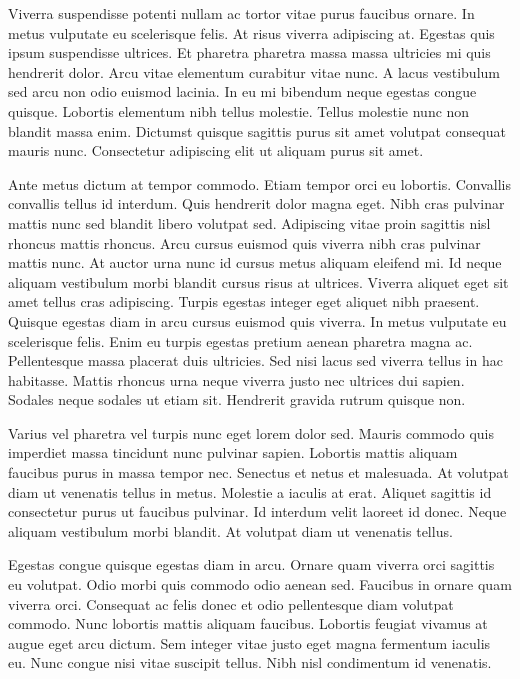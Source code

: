 Viverra suspendisse potenti nullam ac tortor vitae purus faucibus ornare. In metus vulputate eu scelerisque felis. At risus viverra adipiscing at. Egestas quis ipsum suspendisse ultrices. Et pharetra pharetra massa massa ultricies mi quis hendrerit dolor. Arcu vitae elementum curabitur vitae nunc. A lacus vestibulum sed arcu non odio euismod lacinia. In eu mi bibendum neque egestas congue quisque. Lobortis elementum nibh tellus molestie. Tellus molestie nunc non blandit massa enim. Dictumst quisque sagittis purus sit amet volutpat consequat mauris nunc. Consectetur adipiscing elit ut aliquam purus sit amet.

Ante metus dictum at tempor commodo. Etiam tempor orci eu lobortis. Convallis convallis tellus id interdum. Quis hendrerit dolor magna eget. Nibh cras pulvinar mattis nunc sed blandit libero volutpat sed. Adipiscing vitae proin sagittis nisl rhoncus mattis rhoncus. Arcu cursus euismod quis viverra nibh cras pulvinar mattis nunc. At auctor urna nunc id cursus metus aliquam eleifend mi. Id neque aliquam vestibulum morbi blandit cursus risus at ultrices. Viverra aliquet eget sit amet tellus cras adipiscing. Turpis egestas integer eget aliquet nibh praesent. Quisque egestas diam in arcu cursus euismod quis viverra. In metus vulputate eu scelerisque felis. Enim eu turpis egestas pretium aenean pharetra magna ac. Pellentesque massa placerat duis ultricies. Sed nisi lacus sed viverra tellus in hac habitasse. Mattis rhoncus urna neque viverra justo nec ultrices dui sapien. Sodales neque sodales ut etiam sit. Hendrerit gravida rutrum quisque non.

Varius vel pharetra vel turpis nunc eget lorem dolor sed. Mauris commodo quis imperdiet massa tincidunt nunc pulvinar sapien. Lobortis mattis aliquam faucibus purus in massa tempor nec. Senectus et netus et malesuada. At volutpat diam ut venenatis tellus in metus. Molestie a iaculis at erat. Aliquet sagittis id consectetur purus ut faucibus pulvinar. Id interdum velit laoreet id donec. Neque aliquam vestibulum morbi blandit. At volutpat diam ut venenatis tellus.

Egestas congue quisque egestas diam in arcu. Ornare quam viverra orci sagittis eu volutpat. Odio morbi quis commodo odio aenean sed. Faucibus in ornare quam viverra orci. Consequat ac felis donec et odio pellentesque diam volutpat commodo. Nunc lobortis mattis aliquam faucibus. Lobortis feugiat vivamus at augue eget arcu dictum. Sem integer vitae justo eget magna fermentum iaculis eu. Nunc congue nisi vitae suscipit tellus. Nibh nisl condimentum id venenatis.